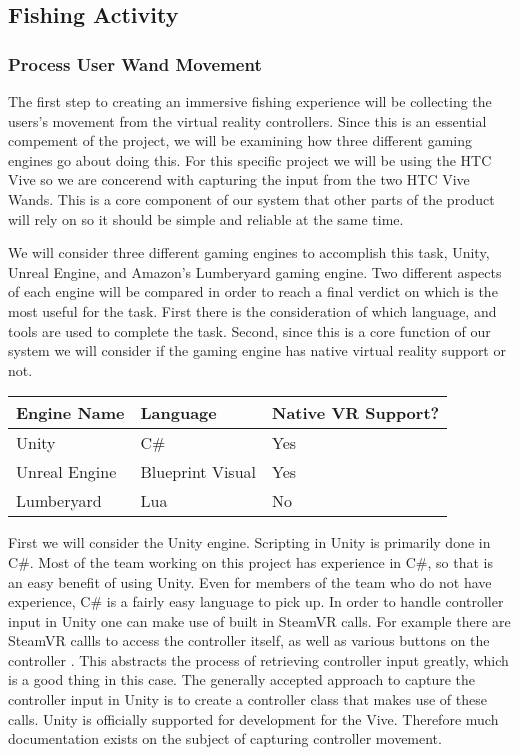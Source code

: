 \documentclass[10pt,journal,compsoc,onecolumn, draftclsnofoot]{IEEEtran}
\begin{document}
\subsection{Fishing Activity}
\subsubsection{Process User Wand Movement}
The first step to creating an immersive fishing experience will be collecting the users's movement from the virtual reality controllers.
Since this is an essential compement of the project, we will be examining how three different gaming engines go about doing this.
For this specific project we will be using the HTC Vive so we are concerend with capturing the input from the two HTC Vive Wands.
This is a core component of our system that other parts of the product will rely on so it should be simple and reliable at the same time.

We will consider three different gaming engines to accomplish this task, Unity, Unreal Engine, and Amazon's Lumberyard gaming engine.
Two different aspects of each engine will be compared in order to reach a final verdict on which is the most useful for the task.
First there is the consideration of which language, and tools are used to complete the task.
Second, since this is a core function of our system we will consider if the gaming engine has native virtual reality support or not.

\vspace{2mm}
\begin{table}[h!]
\centering
  \begin{tabu} to 1.0\textwidth { | X[l] || X[c] | X[c] |  }
  \hline
  Engine Name & Language & Native VR Support?\\
  \hline
  Unity  & C\# & Yes\\
  Unreal Engine & Blueprint Visual & Yes\\
  Lumberyard & Lua & No\\
  \hline
  \end{tabu}
\end{table}
\vspace{2mm}

First we will consider the Unity engine. Scripting in Unity is primarily done in C\#.
Most of the team working on this project has experience in C\#, so that is an easy benefit of using Unity.
Even for members of the team who do not have experience, C\# is a fairly easy language to pick up.
In order to handle controller input in Unity one can make use of built in SteamVR calls.
For example there are SteamVR callls to access the controller itself, as well as various buttons on the controller \cite{steamvr_controllers}.
This abstracts the process of retrieving controller input greatly, which is a good thing in this case.
The generally accepted approach to capture the controller input in Unity is to create a controller class that makes use of these calls.
Unity is officially supported for development for the Vive.
Therefore much documentation exists on the subject of capturing controller movement.
\end{document}
